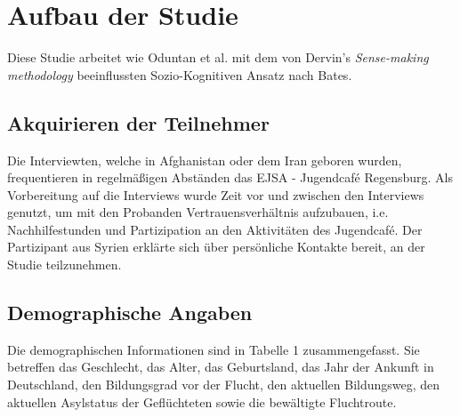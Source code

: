 
\section{Aufbau der Studie}
Diese Studie arbeitet wie Oduntan et al.\cite{oduntan2017investigating} mit dem von Dervin's \textit{Sense-making methodology} beeinflussten Sozio-Kognitiven Ansatz nach Bates\cite{bates2005introduction}.

\subsection{Akquirieren der Teilnehmer}
Die Interviewten, welche in Afghanistan oder dem Iran geboren wurden, frequentieren in regelmäßigen Abständen das EJSA - Jugendcafé Regensburg. Als Vorbereitung auf die Interviews wurde Zeit vor und zwischen den Interviews genutzt, um mit den Probanden Vertrauensverhältnis aufzubauen, i.e. Nachhilfestunden und Partizipation an den Aktivitäten des Jugendcafé.\newline
Der Partizipant aus Syrien erklärte sich über persönliche Kontakte bereit, an der Studie teilzunehmen.

\subsection{Demographische Angaben}

Die demographischen Informationen sind in Tabelle 1 zusammengefasst. Sie betreffen das Geschlecht, das Alter, das Geburtsland, das Jahr der Ankunft in Deutschland, den Bildungsgrad vor der Flucht, den aktuellen Bildungsweg, den aktuellen Asylstatus der Geflüchteten sowie die bewältigte Fluchtroute.


